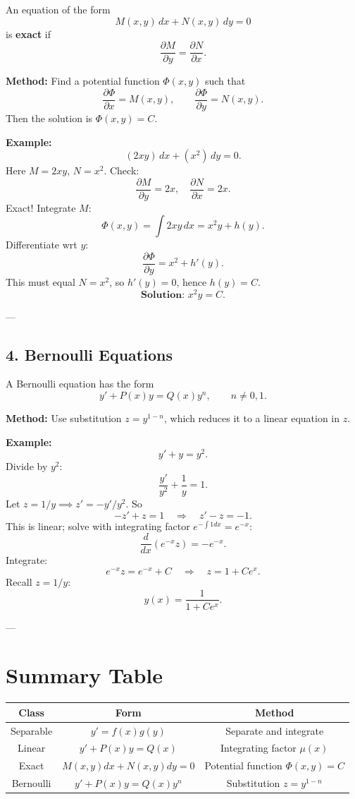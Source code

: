 \documentclass[11pt,a4paper]{article}
\begin{document}
	An equation of the form
	$$
	M(x,y)\,dx + N(x,y)\,dy = 0
	$$
	is \textbf{exact} if
	$$
	\frac{\partial M}{\partial y} = \frac{\partial N}{\partial x}.
	$$
	
	\textbf{Method:} Find a potential function $\Phi(x,y)$ such that
	\[
	\frac{\partial \Phi}{\partial x} = M(x,y), \qquad \frac{\partial \Phi}{\partial y} = N(x,y).
	\]
	Then the solution is $\Phi(x,y) = C$.
	
	\textbf{Example:}
	\[
	(2xy)\,dx + (x^2)\,dy = 0.
	\]
	Here $M=2xy$, $N=x^2$.
	Check:
	\[
	\frac{\partial M}{\partial y} = 2x, \quad \frac{\partial N}{\partial x} = 2x.
	\]
	Exact! Integrate $M$:
	\[
	\Phi(x,y) = \int 2xy\,dx = x^2 y + h(y).
	\]
	Differentiate wrt $y$:
	\[
	\frac{\partial \Phi}{\partial y} = x^2 + h'(y).
	\]
	This must equal $N = x^2$, so $h'(y)=0$, hence $h(y)=C$.
	\[
	\textbf{Solution: } x^2 y = C.
	\]
	
	---
	
	\subsection*{4. Bernoulli Equations}
	
	A Bernoulli equation has the form
	$$
	y' + P(x)y = Q(x)y^n, \qquad n \neq 0,1.
	$$
	
	\textbf{Method:} Use substitution $z = y^{1-n}$, which reduces it to a linear equation in $z$.
	
	\textbf{Example:}
	\[
	y' + y = y^2.
	\]
	Divide by $y^2$:
	\[
	\frac{y'}{y^2} + \frac{1}{y} = 1.
	\]
	Let $z = 1/y \implies z' = -y'/y^2$.
	So
	\[
	-z' + z = 1 \quad \Rightarrow \quad z' - z = -1.
	\]
	This is linear; solve with integrating factor $e^{-\int 1 dx}=e^{-x}$:
	\[
	\frac{d}{dx}(e^{-x} z) = -e^{-x}.
	\]
	Integrate:
	\[
	e^{-x} z = e^{-x} + C \quad \Rightarrow \quad z = 1 + Ce^x.
	\]
	Recall $z=1/y$:
	\[
	y(x) = \frac{1}{1+Ce^x}.
	\]
	
	---
	
	\section*{Summary Table}
	
	\begin{tabular}{|c|c|c|}
		\hline
		\textbf{Class} & \textbf{Form} & \textbf{Method} \\
		\hline
		Separable & $y' = f(x)g(y)$ & Separate and integrate \\
		Linear & $y' + P(x)y = Q(x)$ & Integrating factor $\mu(x)$ \\
		Exact & $M(x,y)dx+N(x,y)dy=0$ & Potential function $\Phi(x,y)=C$ \\
		Bernoulli & $y' + P(x)y = Q(x)y^n$ & Substitution $z=y^{1-n}$ \\
		\hline
	\end{tabular}
	
\end{document}
